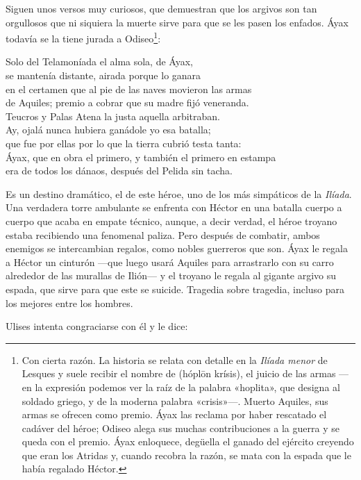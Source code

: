 Siguen unos versos muy curiosos, que demuestran que los argivos son tan orgullosos que ni siquiera la muerte sirve para que se les pasen los enfados. Áyax todavía se la tiene jurada a Odiseo\footnote{Con cierta razón. La historia se relata con detalle en la \emph{Ilíada menor} de Lesques y suele recibir el nombre de  (hóplōn krísis), el juicio de las armas ---en la expresión podemos ver la raíz de la palabra «hoplita», que designa al soldado griego, y de la moderna palabra «crisis»---. Muerto Aquiles, sus armas se ofrecen como premio. Áyax las reclama por haber rescatado el cadáver del héroe; Odiseo alega sus muchas contribuciones a la guerra y se queda con el premio. Áyax enloquece, degüella el ganado del ejército creyendo que eran los Atridas y, cuando recobra la razón, se mata con la espada que le había regalado Héctor.}:


\begin{versocita}
Solo del Telamoníada el alma sola, de Áyax,\\
se mantenía distante, airada porque lo ganara\\
en el certamen que al pie de las naves movieron las armas\\
de Aquiles; premio a cobrar que su madre fijó veneranda.\\
Teucros y Palas Atena la justa aquella arbitraban.\\
Ay, ojalá nunca hubiera ganádole yo esa batalla;\\
que fue por ellas por lo que la tierra cubrió testa tanta:\\
Áyax, que en obra el primero, y también el primero en estampa\\
era de todos los dánaos, después del Pelida sin tacha.
\end{versocita}

Es un destino dramático, el de este héroe, uno de los más simpáticos de la \emph{Ilíada}. Una verdadera torre ambulante se enfrenta con Héctor en una batalla cuerpo a cuerpo que acaba en empate técnico, aunque, a decir verdad, el héroe troyano estaba recibiendo una fenomenal paliza. Pero después de combatir, ambos enemigos se intercambian regalos, como nobles guerreros que son. Áyax le regala a Héctor un cinturón ---que luego usará Aquiles para arrastrarlo con su carro alrededor de las murallas de Ilión--- y el troyano le regala al gigante argivo su espada, que sirve para que este se suicide. Tragedia sobre tragedia, incluso para los mejores entre los hombres.

Ulises intenta congraciarse con él y le dice:

